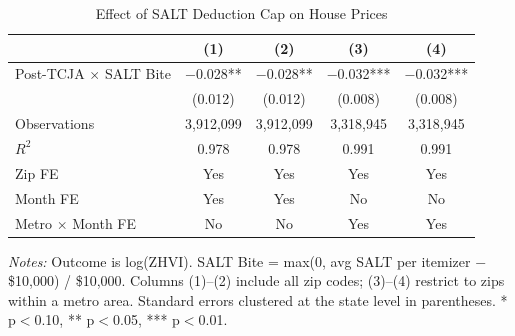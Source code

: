 \begin{table}[H]
\centering
\caption{Effect of SALT Deduction Cap on House Prices}
\label{tab:main}
\begin{threeparttable}
\begin{tabular}{@{}lcccc@{}}
\toprule
 & (1) & (2) & (3) & (4) \\
\midrule
Post-TCJA $\times$ SALT Bite & $-$0.028** & $-$0.028** & $-$0.032*** & $-$0.032*** \\
 & (0.012) & (0.012) & (0.008) & (0.008) \\[6pt]
Observations & 3,912,099 & 3,912,099 & 3,318,945 & 3,318,945 \\
$R^2$ & 0.978 & 0.978 & 0.991 & 0.991 \\
\midrule
Zip FE & Yes & Yes & Yes & Yes \\
Month FE & Yes & Yes & No & No \\
Metro $\times$ Month FE & No & No & Yes & Yes \\
\bottomrule
\end{tabular}
\begin{tablenotes}[flushleft]
\small
\item \textit{Notes:} Outcome is log(ZHVI). SALT Bite = max(0, avg SALT per itemizer $-$ \$10,000) / \$10,000. Columns (1)--(2) include all zip codes; (3)--(4) restrict to zips within a metro area. Standard errors clustered at the state level in parentheses. * p$<$0.10, ** p$<$0.05, *** p$<$0.01.
\end{tablenotes}
\end{threeparttable}
\end{table}
